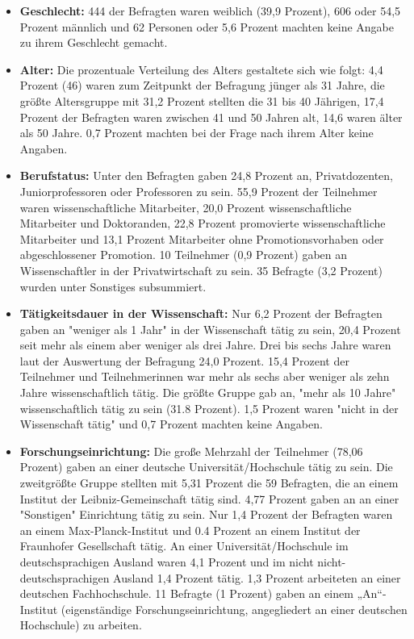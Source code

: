 \begin{itemize}
\item \textbf{Geschlecht:} 444 der Befragten waren weiblich (39,9 Prozent), 606 oder 54,5 Prozent männlich und 62 Personen oder 5,6 Prozent machten keine Angabe zu ihrem Geschlecht gemacht.
\item \textbf{Alter:} Die prozentuale Verteilung des Alters gestaltete sich wie folgt: 4,4 Prozent (46) waren zum Zeitpunkt der Befragung jünger als 31 Jahre, die größte Altersgruppe mit 31,2 Prozent stellten die 31 bis 40 Jährigen, 17,4 Prozent der Befragten waren zwischen 41 und 50 Jahren alt, 14,6 waren älter als 50 Jahre. 0,7 Prozent machten bei der Frage nach ihrem Alter keine Angaben.
\item \textbf{Berufstatus:} Unter den Befragten gaben 24,8 Prozent an, Privatdozenten, Juniorprofessoren oder Professoren zu sein. 55,9 Prozent der Teilnehmer waren wissenschaftliche Mitarbeiter, 20,0 Prozent wissenschaftliche Mitarbeiter und Doktoranden, 22,8 Prozent promovierte wissenschaftliche Mitarbeiter und 13,1 Prozent Mitarbeiter ohne Promotionsvorhaben oder abgeschlossener Promotion. 10 Teilnehmer (0,9 Prozent) gaben an Wissenschaftler in der Privatwirtschaft zu sein. 35 Befragte (3,2 Prozent) wurden unter Sonstiges subsummiert.
\item \textbf{Tätigkeitsdauer in der Wissenschaft:} Nur 6,2 Prozent der Befragten gaben an "weniger als 1 Jahr" in der Wissenschaft tätig zu sein, 20,4 Prozent seit mehr als einem aber weniger als drei Jahre. Drei bis sechs Jahre waren laut der Auswertung der Befragung 24,0 Prozent. 15,4 Prozent der Teilnehmer und Teilnehmerinnen war mehr als sechs aber weniger als zehn Jahre wissenschaftlich tätig. Die größte Gruppe gab an, "mehr als 10 Jahre" wissenschaftlich tätig zu sein (31.8 Prozent). 1,5 Prozent waren "nicht in der Wissenschaft tätig" und 0,7 Prozent machten keine Angaben.
\item \textbf{Forschungseinrichtung:} Die große Mehrzahl der Teilnehmer (78,06 Prozent) gaben an einer deutsche Universität/Hochschule tätig zu sein. Die zweitgrößte Gruppe stellten mit 5,31 Prozent die 59 Befragten, die an einem Institut der Leibniz-Gemeinschaft tätig sind. 4,77 Prozent gaben an an einer "Sonstigen" Einrichtung tätig zu sein. Nur 1,4 Prozent der Befragten waren an einem Max-Planck-Institut und 0.4 Prozent an einem Institut der Fraunhofer Gesellschaft tätig. An einer Universität/Hochschule im deutschsprachigen Ausland waren 4,1 Prozent und im nicht nicht-deutschsprachigen Ausland 1,4 Prozent tätig. 1,3 Prozent arbeiteten an einer deutschen Fachhochschule. 11 Befragte (1 Prozent) gaben an einem „An“-Institut (eigenständige Forschungseinrichtung, angegliedert an einer deutschen Hochschule) zu arbeiten.
\end{itemize}


